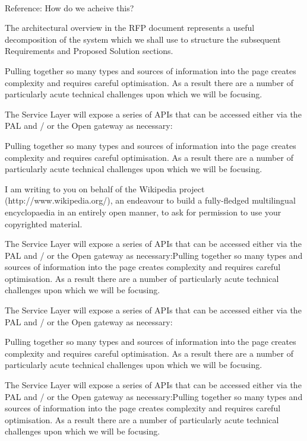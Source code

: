 \documentclass[10pt, paper=A4, parskip=full,asymTypB,
               enlargefirstpage ]{scrlttr2}
\begin{document}
\begin{letter}{%
\tystrrecipient \\
\tystrrecipientaddress
}
\opening{\tystropening}

Reference: How do we acheive this? 

The architectural overview in the RFP document represents a useful decomposition of the system which we shall use to structure the subsequent Requirements and Proposed Solution sections.

Pulling together so many types and sources of information into the page creates complexity and requires careful optimisation. As a result there are a number of particularly acute technical challenges upon which we will be focusing.

The Service Layer will expose a series of APIs that can be accessed either via the PAL and / or the Open gateway as necessary:

Pulling together so many types and sources of information into the page creates complexity and requires careful optimisation. As a result there are a number of particularly acute technical challenges upon which we will be focusing.

 
I am writing to you on behalf of the Wikipedia project (http://www.wikipedia.org/),
an endeavour to build a fully-fledged multilingual encyclopaedia in an entirely
open manner, to ask for permission to use your copyrighted material.

The Service Layer will expose a series of APIs that can be accessed either via the PAL and / or the Open gateway as necessary:Pulling together so many types and sources of information into the page creates complexity and requires careful optimisation. As a result there are a number of particularly acute technical challenges upon which we will be focusing.

The Service Layer will expose a series of APIs that can be accessed either via the PAL and / or the Open gateway as necessary:

Pulling together so many types and sources of information into the page creates complexity and requires careful optimisation. As a result there are a number of particularly acute technical challenges upon which we will be focusing.

The Service Layer will expose a series of APIs that can be accessed either via the PAL and / or the Open gateway as necessary:Pulling together so many types and sources of information into the page creates complexity and requires careful optimisation. As a result there are a number of particularly acute technical challenges upon which we will be focusing.


\end{letter}
\end{document}
